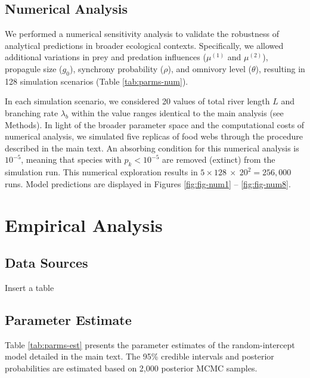 \documentclass[11pt, class=article, crop=false]{standalone}
\theoremstyle{definition}
\begin{document}
\newpage

\subsection{Numerical Analysis}

We performed a numerical sensitivity analysis to validate the robustness of analytical predictions in broader ecological contexts.
Specifically, we allowed additional variations in prey and predation influences ($\mu^{(1)}$ and $\mu^{(2)}$), propagule size ($g_0$), synchrony probability ($\rho$), and omnivory level ($\theta$), resulting in 128 simulation scenarios (Table \ref{tab:parms-num}).

In each simulation scenario, we considered 20 values of total river length $L$ and branching rate $\lambda_b$ within the value ranges identical to the main analysis (see Methods).
In light of the broader parameter space and the computational costs of numerical analysis, we simulated five replicas of food webs through the procedure described in the main text.
An absorbing condition for this numerical analysis is $10^{-5}$, meaning that species with $p_k < 10^{-5}$ are removed (extinct) from the simulation run.
This numerical exploration results in $5 \times 128~\times~20^2 = 256,000$ runs.
Model predictions are displayed in Figures \ref{fig:fig-num1} -- \ref{fig:fig-num8}.



\newpage



\section{Empirical Analysis}

\subsection{Data Sources}

Insert a table

\subsection{Parameter Estimate}

Table \ref{tab:parms-est} presents the parameter estimates of the random-intercept model detailed in the main text.
The 95\% credible intervals and posterior probabilities are estimated based on 2,000 posterior MCMC samples.
\end{document}
